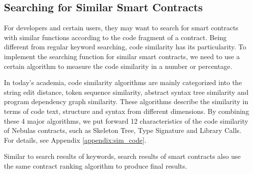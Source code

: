 

\subsection{Searching for Similar Smart Contracts}

For developers and certain users, they may want to search for smart contracts with similar functions according to the code fragment of a contract. Being different from regular keyword searching, code similarity has its particularity. To implement the searching function for similar smart contracts, we need to use a certain algorithm to measure the code similarity in a number or percentage.


In today's academia, code similarity algorithms are mainly categorized into the string edit distance, token sequence similarity, abstract syntax tree similarity and program dependency graph similarity. These algorithms describe the similarity in terms of code text, structure and syntax from different dimensions. By combining these 4 major algorithms, we put forward 12 characteristics of the code similarity of Nebulas contracts, such as Skeleton Tree, Type Signature and Library Calls. For details, see Appendix \ref{appendix:sim_code}.


Similar to search results of keywords, search results of smart contracts also use the same contract ranking algorithm to produce final results.

